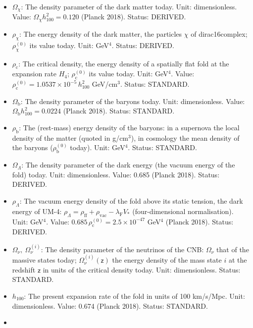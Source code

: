 \documentclass[
  10pt,
]{article}
\providecommand{\tightlist}{%
  \setlength{\itemsep}{0pt}\setlength{\parskip}{0pt}}
\begin{document}
\begin{itemize}
\tightlist
\item
  \(\Omega_\chi\): The density parameter of the dark matter today. Unit:
  dimensionless. Value: \(\Omega_\chi h_{100}^2 = 0.120\) (Planck 2018).
  Status: DERIVED.
\item
  \(\rho_\chi\): The energy density of the dark matter, the particles
  \(\chi\) of dirac16complex; \(\rho_\chi^{(0)}\) its value today. Unit:
  GeV\(^4\). Status: DERIVED.
\item
  \(\rho_{\mathrm{c}}\): The critical density, the energy density of a
  spatially flat fold at the expansion rate \(H_4\);
  \(\rho_{\mathrm{c}}^{(0)}\) its value today. Unit: GeV\(^4\). Value:
  \(\rho_{\mathrm{c}}^{(0)} = 1.0537\times10^{-5}\,h_{100}^2\)
  GeV/cm\(^3\). Status: STANDARD.
\item
  \(\Omega_{\mathrm{b}}\): The density parameter of the baryons today.
  Unit: dimensionless. Value: \(\Omega_{\mathrm{b}}h_{100}^2 = 0.0224\)
  (Planck 2018). Status: STANDARD.
\item
  \(\rho_{\mathrm{b}}\): The (rest-mass) energy density of the baryons:
  in a supernova the local density of the matter (quoted in g/cm\(^3\)),
  in cosmology the mean density of the baryons
  (\(\rho_{\mathrm{b}}^{(0)}\) today). Unit: GeV\(^4\). Status:
  STANDARD.
\item
  \(\Omega_\Lambda\): The density parameter of the dark energy (the
  vacuum energy of the fold) today. Unit: dimensionless. Value: 0.685
  (Planck 2018). Status: DERIVED.
\item
  \(\rho_\Lambda\): The vacuum energy density of the fold above its
  static tension, the dark energy of UM-4:
  \(\rho_\Lambda = \rho_{\mathrm{ff}} + \rho_{\mathrm{vac}} - \lambda_{\mathrm{F}}V_*\)
  (four-dimensional normalisation). Unit: GeV\(^4\). Value:
  \(0.685\,\rho_{\mathrm{c}}^{(0)} = 2.5\times10^{-47}\) GeV\(^4\)
  (Planck 2018). Status: DERIVED.
\item
  \(\Omega_\nu,\ \Omega_\nu^{(i)}\): The density parameter of the
  neutrinos of the CNB: \(\Omega_\nu\) that of the massive states today;
  \(\Omega_\nu^{(i)}(\mathsf{z})\) the energy density of the mass state
  \(i\) at the redshift \(\mathsf{z}\) in units of the critical density
  today. Unit: dimensionless. Status: STANDARD.
\item
  \(h_{100}\): The present expansion rate of the fold in units of 100
  km/s/Mpc. Unit: dimensionless. Value: 0.674 (Planck 2018). Status:
  STANDARD.
\item

\end{itemize}
\end{document}
